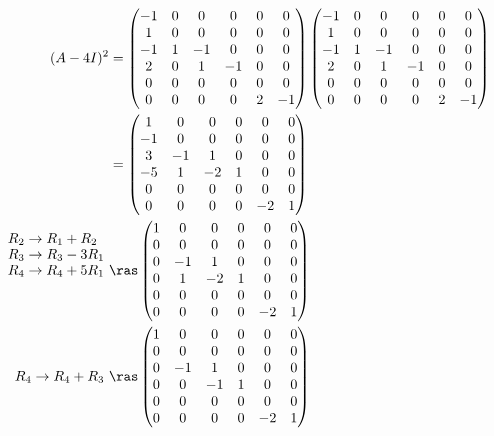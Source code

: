 \documentclass[11pt]{scrartcl}
\begin{document}
\begin{soln}
\begin{align}
(A- 4I)^{2} &=
  \begin{pmatrix}
    -1  & 0 & 0 & 0 & 0 & 0 \\
    1  & 0 & 0 & 0 & 0 & 0 \\
    -1 & 1 & -1 & 0 & 0 & 0 \\
    2  & 0 & 1 & -1 & 0 & 0 \\
    0  & 0 & 0 & 0 & 0 & 0 \\
    0  & 0 & 0 & 0 & 2 & -1
  \end{pmatrix}
  \begin{pmatrix}
    -1  & 0 & 0 & 0 & 0 & 0 \\
    1  & 0 & 0 & 0 & 0 & 0 \\
    -1 & 1 & -1 & 0 & 0 & 0 \\
    2  & 0 & 1 & -1 & 0 & 0 \\
    0  & 0 & 0 & 0 & 0 & 0 \\
    0  & 0 & 0 & 0 & 2 & -1
  \end{pmatrix}\\
&=
  \begin{pmatrix}
    1  & 0 & 0 & 0 & 0 & 0 \\
    -1  & 0 & 0 & 0 & 0 & 0 \\
    3 & -1 & 1 & 0 & 0 & 0 \\
    -5  & 1 & -2 & 1 & 0 & 0 \\
    0  & 0 & 0 & 0 & 0 & 0 \\
    0  & 0 & 0 & 0 & -2 & 1
  \end{pmatrix}\\
  \shortstack[l]{ 
$R_2\to R_1+R_2$\\
$R_3\to R_3-3R_1$\\
$R_4\to R_4+5R_1$ }
\ &\ras 
  \begin{pmatrix}
    1  & 0 & 0 & 0 & 0 & 0 \\
    0  & 0 & 0 & 0 & 0 & 0 \\
    0 & -1 & 1 & 0 & 0 & 0 \\
    0  & 1 & -2 & 1 & 0 & 0 \\
    0  & 0 & 0 & 0 & 0 & 0 \\
    0  & 0 & 0 & 0 & -2 & 1
  \end{pmatrix}\\
R_4 \to R_4 + R_3\ &\ras
  \begin{pmatrix}
    1  & 0 & 0 & 0 & 0 & 0 \\
    0  & 0 & 0 & 0 & 0 & 0 \\
    0 & -1 & 1 & 0 & 0 & 0 \\
    0  & 0 & -1 & 1 & 0 & 0 \\
    0  & 0 & 0 & 0 & 0 & 0 \\
    0  & 0 & 0 & 0 & -2 & 1
  \end{pmatrix}
\end{align}


\end{soln}
\end{document}
